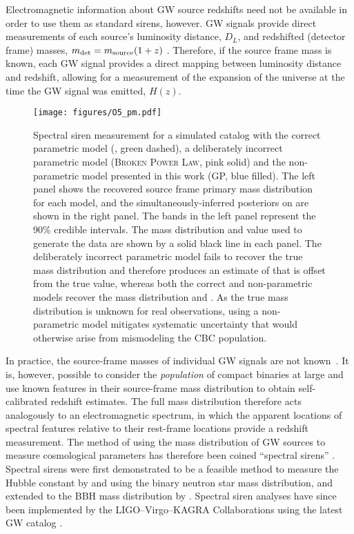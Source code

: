 \documentclass[preprint2,linenumbers]{aastex631}
\begin{document}
Electromagnetic information about \ac{GW} source redshifts need not be available in order to use them as standard sirens, however.
\ac{GW} signals provide direct measurements of each source's luminosity distance, $D_L$, and redshifted (detector frame) masses, $m_{\det}= m_{\text{source}}(1+z)$ \citep[e.g.][]{chen_mass-redshift_2019}.
Therefore, if the source frame mass is known, each \ac{GW} signal provides a direct mapping between luminosity distance and redshift, allowing for a measurement of the expansion of the universe at the time the \ac{GW} signal was emitted, $H(z)$.
\begin{figure*}
    \centering
    \texttt{[image: figures/O5\_pm.pdf]}
    \caption{Spectral siren measurement for a simulated catalog with the correct parametric model (\plp, green dashed), a deliberately incorrect parametric model (\textsc{Broken Power Law}, pink solid) and the non-parametric model presented in this work (\acl{GP}, blue filled).
    The left panel shows the recovered source frame primary mass distribution for each model, and the simultaneously-inferred posteriors on \Ho{} are shown in the right panel.
    The bands in the left panel represent the 90\% credible intervals.
    The mass distribution and \Ho{} value used to generate the data are shown by a solid black line in each panel. 
    The deliberately incorrect parametric model fails to recover the true mass distribution and therefore produces an estimate of \Ho{} that is offset from the true value, whereas both the correct and non-parametric models recover the mass distribution and \Ho{}.
    As the true mass distribution is unknown for real observations, using a non-parametric model mitigates systematic uncertainty that would otherwise arise from mismodeling the \ac{CBC} population.
    }
    \label{fig:O5_GP}
\end{figure*}

In practice, the source-frame masses of individual \ac{GW} signals are not known~\citep[unless tidal information is available, e.g.][]{messenger_measuring_2012, 2021PhRvD.104h3528C}.
It is, however, possible to consider the \textit{population} of compact binaries at large and use known features in their source-frame mass distribution to obtain self-calibrated redshift estimates.
The full mass distribution therefore acts analogously to an electromagnetic spectrum, in which the apparent locations of spectral features relative to their rest-frame locations provide a redshift measurement.
The method of using the mass distribution of \ac{GW} sources to measure cosmological parameters has therefore been coined ``spectral sirens'' \citep{ezquiaga_spectral_2022}.
Spectral sirens were first demonstrated to be a feasible method to measure the Hubble constant by \cite{chernoff_gravitational_1993} and \cite{Taylor:2011fs} using the binary neutron star mass distribution, and extended to the \ac{BBH} mass distribution by \cite{farr_future_2019}. 
Spectral siren analyses have since been implemented by the LIGO--Virgo--KAGRA Collaborations using the latest \ac{GW} catalog \citep{gwtc3_cosmo}.
\end{document}
